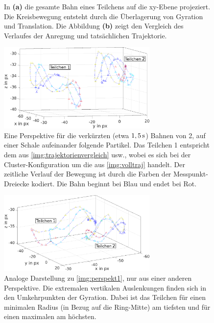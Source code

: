 \documentclass[numbers=noenddot,a4paper,notitlepage,twoside,BCOR15mm]{scrbook}
\newcommand{\fett}[1]{\textbf{#1}}
\begin{document}
\begin{figure}[!h]
\begin{subfigure}{0.49\textwidth}
								\caption{}\label{img:trajektorienvergleich}
							\end{subfigure}
							\caption{In \fett{(a)} die gesamte Bahn eines Teilchens auf die xy-Ebene projeziert. Die Kreisbewegung entsteht durch die Überlagerung von Gyration und Translation. Die Abbildung \fett{(b)} zeigt den Vergleich des Verlaufes der Anregung und tatsächlichen Trajektorie.}
						\end{figure}

	\newpage

							\begin{figure}[!h]
								\centering
								\includegraphics[width=0.7\textwidth]{figs/auswertung/gyratcoloredeins.png}
								\caption{Eine Perspektive für die verkürzten (etwa $\unit[1,5]{s}$) Bahnen von 2, auf einer Schale aufeinander folgende Partikel. Das Teilchen 1 entspricht dem aus \autoref{img:trajektorienvergleich} usw., wobei es sich bei der Cluster-Konfiguration um die aus \autoref{img:volltraj} handelt. Der zeitliche Verlauf der Bewegung ist durch die Farben der Messpunkt-Dreiecke kodiert. Die Bahn beginnt bei Blau und endet bei Rot.}\label{img:perspekt1}
							\end{figure}

							\begin{figure}[!h]
								\centering
								\includegraphics[width=0.7\textwidth]{figs/auswertung/gyratcoloredzwei.png}
								\caption{Analoge Darstellung zu \autoref{img:perspekt1}, nur aus einer anderen Perspektive. Die extremalen vertikalen Auslenkungen finden sich in den Umkehrpunkten der Gyration. Dabei ist das Teilchen für einen minimalen Radius (in Bezug auf die Ring-Mitte) am tiefsten und für einen maximalen am höchsten.}\label{img:perspekt2}
							\end{figure}
\end{document}
